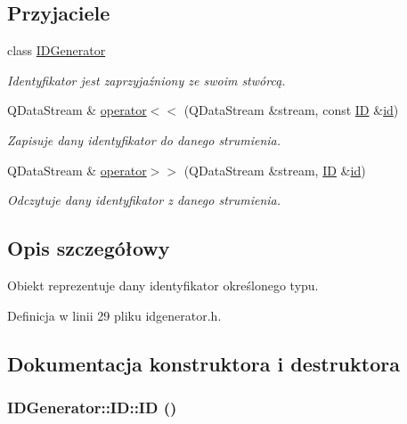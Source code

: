 \subsection*{Przyjaciele}
\begin{DoxyCompactItemize}
\item 
class \hyperlink{classIDGenerator_1_1ID_a85bc66475d72826ee03d9f388d7fcd0f}{IDGenerator}
\begin{DoxyCompactList}\small\item\em Identyfikator jest zaprzyjaźniony ze swoim stwórcą. \item\end{DoxyCompactList}\item 
QDataStream \& \hyperlink{classIDGenerator_1_1ID_ac7c84abfa059c0c94c7a0c53ffe2b4fc}{operator$<$$<$} (QDataStream \&stream, const \hyperlink{classIDGenerator_1_1ID}{ID} \&\hyperlink{classIDGenerator_1_1ID_a284b4a6d5b96b758a3ba11b5539d0878}{id})
\begin{DoxyCompactList}\small\item\em Zapisuje dany identyfikator do danego strumienia. \item\end{DoxyCompactList}\item 
QDataStream \& \hyperlink{classIDGenerator_1_1ID_a30f4c9e493a25817666bb64ce4fd1168}{operator$>$$>$} (QDataStream \&stream, \hyperlink{classIDGenerator_1_1ID}{ID} \&\hyperlink{classIDGenerator_1_1ID_a284b4a6d5b96b758a3ba11b5539d0878}{id})
\begin{DoxyCompactList}\small\item\em Odczytuje dany identyfikator z danego strumienia. \item\end{DoxyCompactList}\end{DoxyCompactItemize}


\subsection{Opis szczegółowy}
Obiekt reprezentuje dany identyfikator określonego typu. 

Definicja w linii 29 pliku idgenerator.h.



\subsection{Dokumentacja konstruktora i destruktora}
\hypertarget{classIDGenerator_1_1ID_aadc91850d9ea6ba775aa07b7f214a7a5}{
\subsubsection[{ID}]{\setlength{\rightskip}{0pt plus 5cm}IDGenerator::ID::ID ()}}
\label{classIDGenerator_1_1ID_aadc91850d9ea6ba775aa07b7f214a7a5}


